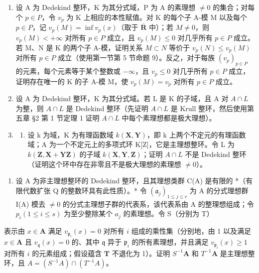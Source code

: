 \begin{enumerate}
\def\labelenumi{\arabic{enumi}.}
\setcounter{enumi}{2}
\item
  设 A 为 Dedekind 整环，K 为其分式域，P 为 A 的素理想 \(\neq 0\) 的集合；对每个 \(p \in P\)，令 \(v_{p}\) 为 K 上相应的本性赋值。对 K 的每个子 A-模 M 以及每个 \(p \in P\)，记 \(v_{p}(M) = \inf v_{p}(x)\)（取于 \(\overline{\mathbf{R}}\) 中）；若 \(M \neq 0\)，则 \(v_{p}(M) < +\infty\) 对所有 \(p \in P\) 成立，且 \(v_{p}(M) \leqslant 0\) 对几乎所有 \(p \in P\) 成立。若 M、N 是 K 的两个子 A-模，证明关系 \(M \subset N\) 等价于 \(v_{p}(N) \leqslant v_{p}(M)\) 对所有 \(p \in P\) 成立（使用第一节第 5 节命题 9）。反之，对于每族 \((v_{p})_{p \in P}\) 的元素，每个元素等于某个整数或 \(-\infty\)，且 \(v_{p} \leqslant 0\) 对几乎所有 \(p \in P\) 成立，证明存在唯一的 K 的子 A-模 M，使 \(v_{p}(M) = v_{p}\) 对所有 \(p \in P\) 成立。
\item
  设 A 为 Dedekind 整环，K 为其分式域。若 L 是 K 的子域，且 A 对 \(A \cap L\) 为整，则 \(A \cap L\) 是 Dedekind 整环（先证明 \(A \cap L\) 是 Krull 整环，然后使用第五章 §2 第 1 节定理 1 证明 \(A \cap L\) 中每个素理想都是极大理想）。
\item
  \begin{enumerate}
  \def\labelenumii{(\alph{enumii})}
  \tightlist
  \item
    设 k 为域，K 为有理函数域 \(k(\mathbf{X}, \mathbf{Y})\)，即 k 上两个不定元的有理函数域；A 为一个不定元上的多项式环 K{[}Z{]}，它是主理想整环。令 L 为 \(k(\mathbf{Z}, \mathbf{X} + \mathbf{Y}\mathbf{Z})\) 的子域 \(k(\mathbf{X}, \mathbf{Y}, \mathbf{Z})\)；证明 \(A \cap L\) 不是 Dedekind 整环（证明这个环中存在非零且不是极大理想的素理想 \(\neq 0\)）。
  \end{enumerate}
\end{enumerate}

\begin{enumerate}
\def\labelenumi{(\alph{enumi})}
\setcounter{enumi}{1}
\tightlist
\item
  设 A 为非主理想整环的 Dedekind 整环，且其理想类群 C(A) 是有限的 *（有限代数扩张 Q 的整数环具有此性质）。* 令 \((\mathfrak{a}_{j})_{1 \leqslant j \leqslant r}\) 为 A 的分式理想群 I(A) 模去 \(\neq 0\) 的分式主理想子群的代表系，该代表系由 A 的整理想组成；令 \(p_{i} (1 \leqslant i \leqslant s)\) 为至少整除某个 \(a_{j}\) 的素理想。令 S（分别为 T）
\end{enumerate}

表示由 \(x \in \mathbf{A}\) 满足 \(v_{\mathfrak{p}_i}(x) = 0\) 对所有 \(i\) 组成的乘性集（分别地，由 1 以及满足 \(x \in \mathbf{A}\) 且 \(v_{\mathfrak{q}}(x) = 0\) 的、其中 \(\mathfrak{q}\) 异于 \(\mathfrak{p}_i\) 的所有素理想，并且满足 \(v_{\mathfrak{p}_i}(x) \geqslant 1\) 对所有 \(i\) 的元素组成；假设蕴含 \(\mathbf{T}\) 不退化为 1）。证明 \(S^{-1}\mathbf{A}\) 和 \(T^{-1}\mathbf{A}\) 是主理想整环，且 \(A = (S^{-1}A) \cap (T^{-1}A)\)。

